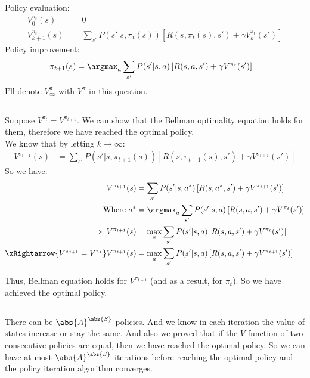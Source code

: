 \documentclass{article}
\begin{document}
\section{}
Policy evaluation:
\begin{align}
V_0^{\pi_{t}}(s) &= 0\\
V_{k+1}^{\pi_{t}}(s) &= \sum_{s'} P(s'|s,\pi_{t}(s)) \left[ R(s,\pi_{t}(s),s') + \gamma V_{k}^{\pi_{t}}(s') \right]
\end{align}
Policy improvement:
\begin{align}
\pi_{t+1}(s) &= \argmax_{a} \sum_{s'} P(s'|s,a) \left[ R(s,a,s') + \gamma V^{\pi_{t}}(s') \right]
\end{align}
I'll denote \(V_{\infty}^{\pi}\) with \(V^{\pi}\) in this question.
\subsection{}
Suppose \(V^{\pi_t} = V^{\pi_{t+1}}\).
We can show that the Bellman optimality equation holds for them, therefore we have reached the optimal policy.\\
We know that by letting \(k \to \infty\):
\begin{align*}
V^{\pi_{t+1}}(s) &= \sum_{s'} P(s'|s,\pi_{t+1}(s)) \left[ R(s,\pi_{t+1}(s),s') + \gamma V^{\pi_{t+1}}(s') \right]
\end{align*}
So we have:
\begin{align*}
V^{\pi_{t+1}}(s) &= \sum_{s'} P(s'|s,a^*) \left[ R(s,a^*,s') + \gamma V^{\pi_{t+1}}(s') \right]\\
\text{Where } a^* &= \argmax_{a} \sum_{s'} P(s'|s,a) \left[ R(s,a,s') + \gamma V^{\pi_{t}}(s') \right]\\
\implies V^{\pi_{t+1}}(s) &= \max_a \sum_{s'} P(s'|s,a) \left[ R(s,a,s') + \gamma V^{\pi_{t}}(s') \right]\\
\xRightarrow{V^{\pi_{t+1}} = V^{\pi_{t}}} V^{\pi_{t+1}}(s) &= \max_a \sum_{s'} P(s'|s,a) \left[ R(s,a,s') + \gamma V^{\pi_{t+1}}(s') \right]
\end{align*}

Thus, Bellman equation holds for \(V^{\pi_{t+1}}\) (and as a result, for \(\pi_{t}\)). So we have achieved the optimal policy.

\subsection{}
There can be \(\abs{A}^{\abs{S}}\) policies.
And we know in each iteration the value of states increase or stay the same.
And also we proved that if the \(V\) function of two consecutive policies are equal, then we have reached the optimal policy.
So we can have at most \(\abs{A}^{\abs{S}}\) iterations before reaching the optimal policy and the policy iteration algorithm converges.
\end{document}
